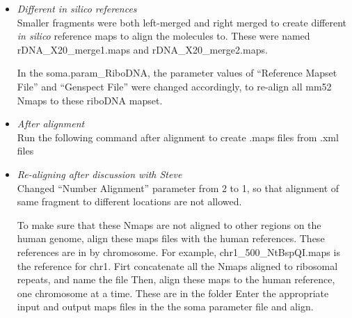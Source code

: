 \documentclass[11pt]{article}
\begin{document}
\begin{itemize}
\item \emph{Different in silico references} \\
Smaller fragments were both left-merged and right merged to create different {\emph{in silico}} reference maps to align the molecules to. These were
 named rDNA\_X20\_merge1.maps and rDNA\_X20\_merge2.maps.

In the soma.param\_RiboDNA, the parameter values of ``Reference Mapset File'' and ``Genspect File'' were changed accordingly, to re-align all mm52 Nmaps to these riboDNA mapset.  

\item \emph{After alignment} \\
Run the following command after alignment to create .maps files from .xml files

\item \emph{Re-aligning after discussion with Steve} \\
Changed ``Number Alignment'' parameter from 2 to 1, so that alignment of same fragment to different locations are not allowed. 

To make sure that these Nmaps are not aligned to other regions on the human genome, align these maps files with the human references. These references are in 
by chromosome. For example, chr1\_500\_NtBspQI.maps is the reference for chr1. Firt concatenate all the Nmaps aligned to ribosomal repeats, and name the file 
Then, align these maps to the human reference, one chromosome at a time. These are in the folder 
Enter the appropriate input and output maps files in the the soma parameter file and align. 

\end{itemize}
\end{document}
